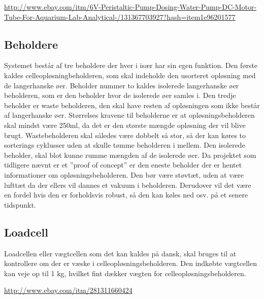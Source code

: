 \url{http://www.ebay.com/itm/6V-Peristaltic-Pump-Dosing-Water-Pump-DC-Motor-Tube-For-Aquarium-Lab-Analytical-/131367703927?hash=item1e96201577}


\subsection{Beholdere}
Systemet består af tre beholdere der hver i især har sin egen funktion. Den første kaldes celleopløsningbeholderen, som skal indeholde den usorteret opløsning med de langerhanske øer. Beholder nummer to kaldes isolerede langerhanske øer beholderen, som er den beholder hvor de isolerede øer samles i. Den tredje beholder er waste beholderen, den skal have resten af opløsningen som ikke består af langerhanske øer. Størrelses kravene til beholderne er at opløsningsbeholderen skal mindst være 250ml, da det er den største mængde opløsning der vil blive brugt. Wastebeholderen skal således være dobbelt så stor, så der kan køres to sorterings cyklusser uden at skulle tømme beholderen i mellem. Den isolerede beholder, skal blot kunne rumme mængden af de isolerede øer. Da projektet som tidligere nævnt er et ”proof of concept” er den eneste beholder der er hentet informationer om opløsningsbeholderen. Den bør være støvtæt, uden at være lufttæt da der ellers vil dannes et vakuum i beholderen. Derudover vil det være en fordel hvis den er forholdsvis robust, så den kan køles ned osv. på et senere tidspunkt.

\subsection{Loadcell}
Loadcellen eller vægtcellen som det kan kaldes på dansk, skal bruges til at kontrollere om der er væske i celleopløsningsbeholderen. Den indkøbte vægtcellen kan veje op til 1 kg, hvilket fint dækker vægten for celleopløsningsbeholderen.

\url{http://www.ebay.com/itm/281311660424}


